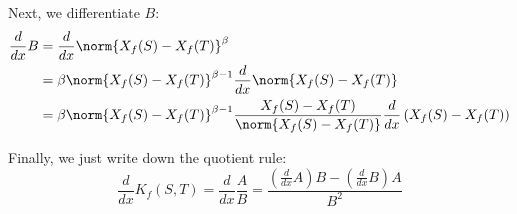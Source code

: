 \documentclass[11pt]{article}
\newcommand{\ddx}{\frac{d}{dx}}
\begin{document}
Next, we differentiate $B$:
\begin{align*}
\ddx B &= \ddx \norm{X_f(S) - X_f(T)}^{\beta}\\
&= \beta \norm{X_f(S) - X_f(T)}^{\beta - 1} \ddx \norm{X_f(S) - X_f(T)}\\
&= \beta \norm{X_f(S) - X_f(T)}^{\beta - 1} \frac{X_f(S) - X_f(T)}{\norm{X_f(S) - X_f(T)}} \ddx \left(X_f(S) - X_f(T)\right)
\end{align*}

Finally, we just write down the quotient rule:
$$\ddx K_f(S, T) = \ddx \frac{A}{B} = \frac{(\ddx A) B - (\ddx B) A}{B^2}$$
\end{document}
